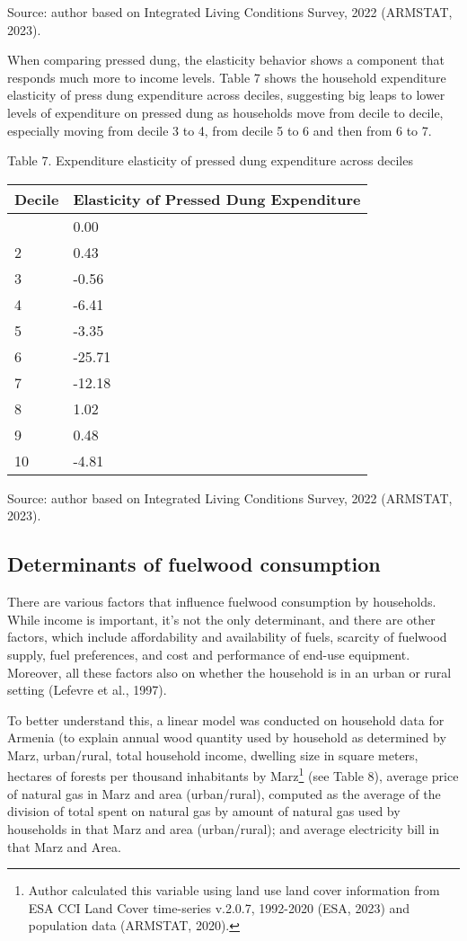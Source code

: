 \documentclass[
  letterpaper,
  DIV=11,
  numbers=noendperiod]{scrartcl}
\begin{document}
Source: author based on Integrated Living Conditions Survey, 2022
(ARMSTAT, 2023).

When comparing pressed dung, the elasticity behavior shows a component
that responds much more to income levels. Table 7 shows the household
expenditure elasticity of press dung expenditure across deciles,
suggesting big leaps to lower levels of expenditure on pressed dung as
households move from decile to decile, especially moving from decile 3
to 4, from decile 5 to 6 and then from 6 to 7.

\label{_Ref156819358}{}Table 7. Expenditure elasticity of
pressed dung expenditure across deciles

\begin{longtable}[]{@{}ll@{}}
\toprule\noalign{}
Decile & Elasticity of Pressed Dung Expenditure \\
\midrule\noalign{}
\endhead
\bottomrule\noalign{}
\endlastfoot
1 & 0.00 \\
2 & 0.43 \\
3 & -0.56 \\
4 & -6.41 \\
5 & -3.35 \\
6 & -25.71 \\
7 & -12.18 \\
8 & 1.02 \\
9 & 0.48 \\
10 & -4.81 \\
\end{longtable}

Source: author based on Integrated Living Conditions Survey, 2022
(ARMSTAT, 2023).

\subsection{Determinants of fuelwood
consumption}\label{determinants-of-fuelwood-consumption}

There are various factors that influence fuelwood consumption by
households. While income is important, it's not the only determinant,
and there are other factors, which include affordability and
availability of fuels, scarcity of fuelwood supply, fuel preferences,
and cost and performance of end-use equipment. Moreover, all these
factors also on whether the household is in an urban or rural setting
(Lefevre et al., 1997).

To better understand this, a linear model was conducted on household
data for Armenia (to explain annual wood quantity used by household as
determined by Marz, urban/rural, total household income, dwelling size
in square meters, hectares of forests per thousand inhabitants by
Marz\footnote{Author calculated this variable using land use land cover
  information from ESA CCI Land Cover time-series v.2.0.7, 1992-2020
  (ESA, 2023) and population data (ARMSTAT, 2020).} (see Table 8),
average price of natural gas in Marz and area (urban/rural), computed as
the average of the division of total spent on natural gas by amount of
natural gas used by households in that Marz and area (urban/rural); and
average electricity bill in that Marz and Area.
\end{document}
